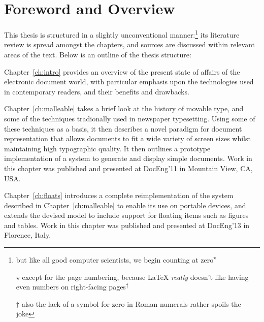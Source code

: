 \chapter{Foreword and Overview}
\setcounter{footnote}{-1}
This thesis is structured in a slightly unconventional manner:\footnote{but like all good computer scientists, we begin counting at zero\textsuperscript{$\star$}

 \vspace{0.8em}
\noindent \scriptsize{$\star$ except for the page numbering, because \LaTeX{} \emph{really} doesn't like having even numbers on right-facing pages\textsuperscript{$\dagger$}}

\vspace{0.8em} 
\noindent \tiny{$\dagger$ also the lack of a symbol for zero in Roman numerals rather spoils the joke}} its literature review is spread amongst the chapters, and sources are discussed within relevant areas of the text. Below is an outline of the thesis structure:

\vspace{1em}
\noindent Chapter~\ref{ch:intro} provides an overview of the present state of affairs of the electronic document world, with particular emphasis upon the technologies used in contemporary \ebook{} readers, and their benefits and drawbacks.

\vspace{1em}
\noindent Chapter~\ref{ch:malleable} takes a brief look at the history of movable type, and some of the techniques tradionally used in newspaper typesetting. Using some of these techniques as a basis, it then describes a novel paradigm for document representation that allows documents to fit a wide variety of screen sizes whilst maintaining high typographic quality. It then outlines a prototype implementation of a system to generate and display simple documents. Work in this chapter was published and presented at DocEng'11 in Mountain View, CA, USA.\hspace{0pt}\cite{Pinkney2011}

\vspace{1em}
\noindent Chapter~\ref{ch:floats} introduces a complete reimplementation of the system described in Chapter~\ref{ch:malleable} to enable its use on portable devices, and extends the devised model to include support for floating items such as figures and tables. Work in this chapter was published and presented at DocEng'13 in Florence, Italy.\hspace{0pt}\cite{Pinkney2013}

